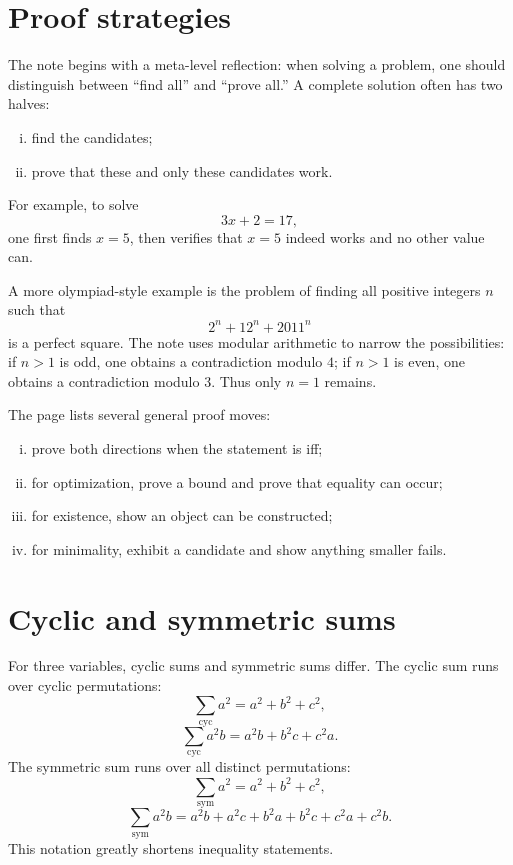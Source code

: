
\section{Proof strategies}

The note begins with a meta-level reflection: when solving a problem, one should distinguish between ``find all'' and ``prove all.''  A complete solution often has two halves:
\begin{enumerate}[(i)]
  \item find the candidates;
  \item prove that these and only these candidates work.
\end{enumerate}

For example, to solve
\[
  3x+2=17,
\]
one first finds \(x=5\), then verifies that \(x=5\) indeed works and no other value can.

A more olympiad-style example is the problem of finding all positive integers \(n\) such that
\[
  2^n+12^n+2011^n
\]
is a perfect square.  The note uses modular arithmetic to narrow the possibilities: if \(n>1\) is odd, one obtains a contradiction modulo \(4\); if \(n>1\) is even, one obtains a contradiction modulo \(3\).  Thus only \(n=1\) remains.

The page lists several general proof moves:
\begin{enumerate}[(i)]
  \item prove both directions when the statement is iff;
  \item for optimization, prove a bound and prove that equality can occur;
  \item for existence, show an object can be constructed;
  \item for minimality, exhibit a candidate and show anything smaller fails.
\end{enumerate}

\section{Cyclic and symmetric sums}

For three variables, cyclic sums and symmetric sums differ.  The cyclic sum runs over cyclic permutations:
\[
  \sum_{\mathrm{cyc}}a^2=a^2+b^2+c^2,
\]
\[
  \sum_{\mathrm{cyc}}a^2b=a^2b+b^2c+c^2a.
\]
The symmetric sum runs over all distinct permutations:
\[
  \sum_{\mathrm{sym}}a^2=a^2+b^2+c^2,
\]
\[
  \sum_{\mathrm{sym}}a^2b
  =a^2b+a^2c+b^2a+b^2c+c^2a+c^2b.
\]
This notation greatly shortens inequality statements.

